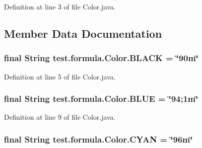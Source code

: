 Definition at line 3 of file Color.\+java.



\subsection{Member Data Documentation}
\hypertarget{classtest_1_1formula_1_1_color_a2722658400f511721eb2638360ffe63d}{}
\subsubsection[{B\+L\+A\+C\+K}]{\setlength{\rightskip}{0pt plus 5cm}final String test.\+formula.\+Color.\+B\+L\+A\+C\+K = \char`\"{}90m\char`\"{}\hspace{0.3cm}{\ttfamily [static]}}\label{classtest_1_1formula_1_1_color_a2722658400f511721eb2638360ffe63d}


Definition at line 5 of file Color.\+java.

\hypertarget{classtest_1_1formula_1_1_color_a5832cda89572843305e1863efef48f05}{}
\subsubsection[{B\+L\+U\+E}]{\setlength{\rightskip}{0pt plus 5cm}final String test.\+formula.\+Color.\+B\+L\+U\+E = \char`\"{}94;1m\char`\"{}\hspace{0.3cm}{\ttfamily [static]}}\label{classtest_1_1formula_1_1_color_a5832cda89572843305e1863efef48f05}


Definition at line 9 of file Color.\+java.

\hypertarget{classtest_1_1formula_1_1_color_ab207902cb19e9e12368f8fb57b9ae0d7}{}
\subsubsection[{C\+Y\+A\+N}]{\setlength{\rightskip}{0pt plus 5cm}final String test.\+formula.\+Color.\+C\+Y\+A\+N = \char`\"{}96m\char`\"{}\hspace{0.3cm}{\ttfamily [static]}}\label{classtest_1_1formula_1_1_color_ab207902cb19e9e12368f8fb57b9ae0d7}


